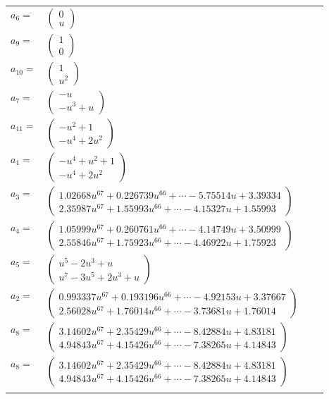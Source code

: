 \documentclass[1p]{elsarticle_modified}
\theoremstyle{definition}
\begin{document}
\begin{tabular}{m{7pt} m{180pt} m{7pt} m{180pt} }
\flushright $a_{6}=$&$\begin{pmatrix}0\\u\end{pmatrix}$ \\
\flushright $a_{9}=$&$\begin{pmatrix}1\\0\end{pmatrix}$ \\
\flushright $a_{10}=$&$\begin{pmatrix}1\\u^2\end{pmatrix}$ \\
\flushright $a_{7}=$&$\begin{pmatrix}- u\\- u^3+u\end{pmatrix}$ \\
\flushright $a_{11}=$&$\begin{pmatrix}- u^2+1\\- u^4+2 u^2\end{pmatrix}$ \\
\flushright $a_{1}=$&$\begin{pmatrix}- u^4+u^2+1\\- u^4+2 u^2\end{pmatrix}$ \\
\flushright $a_{3}=$&$\begin{pmatrix}1.02668 u^{67}+0.226739 u^{66}+\cdots-5.75514 u+3.39334\\2.35987 u^{67}+1.55993 u^{66}+\cdots-4.15327 u+1.55993\end{pmatrix}$ \\
\flushright $a_{4}=$&$\begin{pmatrix}1.05999 u^{67}+0.260761 u^{66}+\cdots-4.14749 u+3.50999\\2.55846 u^{67}+1.75923 u^{66}+\cdots-4.46922 u+1.75923\end{pmatrix}$ \\
\flushright $a_{5}=$&$\begin{pmatrix}u^5-2 u^3+u\\u^7-3 u^5+2 u^3+u\end{pmatrix}$ \\
\flushright $a_{2}=$&$\begin{pmatrix}0.993337 u^{67}+0.193196 u^{66}+\cdots-4.92153 u+3.37667\\2.56028 u^{67}+1.76014 u^{66}+\cdots-3.73681 u+1.76014\end{pmatrix}$ \\
\flushright $a_{8}=$&$\begin{pmatrix}3.14602 u^{67}+2.35429 u^{66}+\cdots-8.42884 u+4.83181\\4.94843 u^{67}+4.15426 u^{66}+\cdots-7.38265 u+4.14843\end{pmatrix}$\\ \flushright $a_{8}=$&$\begin{pmatrix}3.14602 u^{67}+2.35429 u^{66}+\cdots-8.42884 u+4.83181\\4.94843 u^{67}+4.15426 u^{66}+\cdots-7.38265 u+4.14843\end{pmatrix}$\\&\end{tabular}
\end{document}
